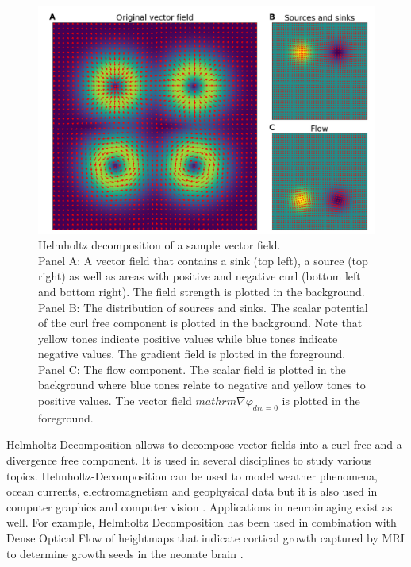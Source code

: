 \begin{figure}[!htb]
\centering
\includegraphics[width=\textwidth,height=\textheight,keepaspectratio]{Figures/helmholtz_decomposition}
\decoRule
\caption[Helmholtz decomposition of a sample vector field]{Helmholtz decomposition of a sample vector field.\\ Panel A: A vector field that contains a sink (top left), a source (top right) as well as areas with positive and negative curl (bottom left and bottom right). The field strength is plotted in the background. Panel B: The distribution of sources and sinks. The scalar potential of the curl free component is plotted in the background. Note that yellow tones indicate positive values while blue tones indicate negative values. The gradient field is plotted in the foreground. Panel C: The flow component. The scalar field is plotted in the background where blue tones relate to negative and yellow tones to positive values. The vector field $mathrm{\nabla}\varphi_{div=0}$ is plotted in the foreground.}
\label{fig:helmholtz_decomposition}
\end{figure}
Helmholtz Decomposition allows to decompose vector fields into a curl free and a divergence free component. It is used in several disciplines to study various topics. Helmholtz-Decomposition can be used to model weather phenomena, ocean currents, electromagnetism and geophysical data but it is also used in computer graphics and computer vision \parencite{bhatia2012helmholtz}. Applications in neuroimaging exist as well. For example, Helmholtz Decomposition has been used in combination with Dense Optical Flow of heightmaps that indicate cortical growth captured by MRI to determine growth seeds in the neonate brain \parencite{lefevre2009identification}.\\
